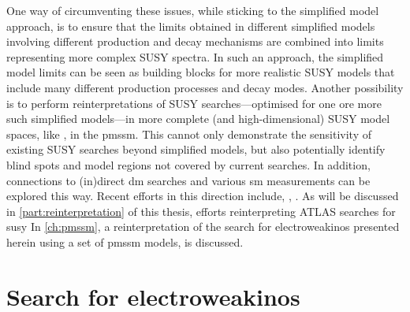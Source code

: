One way of circumventing these issues, while sticking to the simplified model approach, is to ensure that the limits obtained in different simplified models involving different production and decay mechanisms are combined into limits representing more complex SUSY spectra.
In such an approach, the simplified model limits can be seen as building blocks for more realistic SUSY models that include many different production processes and decay modes.
Another possibility is to perform reinterpretations of SUSY searches---optimised for one ore more such simplified models---in more complete (and high-dimensional) SUSY model spaces, like \eg, in the \gls{pmssm}. This cannot only demonstrate the sensitivity of existing SUSY searches beyond simplified models, but also potentially identify blind spots and model regions not covered by current searches.
In addition, connections to (in)direct \gls{dm} searches and various \gls{sm} measurements can be explored this way. Recent efforts in this direction include, \eg, \cite{Ambrogi:2017lov, Aaboud:2016wna, pMSSM-scan-run1:2015baa}. As will be discussed in \cref{part:reinterpretation} of this thesis, efforts reinterpreting ATLAS searches for \gls{susy} In \cref{ch:pmssm}, a reinterpretation of the search for electroweakinos presented herein using a set of \gls{pmssm} models, is discussed.


\section{Search for electroweakinos}

